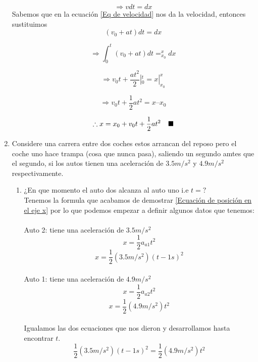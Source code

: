 \documentclass[letterpaper, 12pt]{article}
\begin{document}
\begin{enumerate}
\begin{equation} 
\Longrightarrow v dt = dx 
\end{equation}
Sabemos que en la ecuación \ref{Eq de velocidad} nos da la velocidad, entonces sustituimos 
\begin{equation} 
(v_0 + at) dt = dx 
\end{equation}

\begin{equation} 
\Longrightarrow\int_{0} ^{t} (v_0 + at) dt =  _{x_0} ^{x} dx 
\end{equation}

\begin{equation}
\Longrightarrow v_0 t + \frac{at^2}{2} |_{0}^{t} = x |_{x_0}^{x}
\end{equation}

\begin{equation}
\Longrightarrow v_0 t + \frac{1}{2} at^2 = x – x_0
\end{equation}

\begin{equation}
\therefore x = x_0 + v_0 t + \frac{1}{2} at^2\textcolor{white}{iii} \blacksquare
\end{equation}
    
    \item Considere una carrera entre dos coches estos arrancan del reposo pero el coche uno hace trampa (cosa que nunca pasa), saliendo un segundo amtes que el segundo, si los autos tienen una aceleración de $3.5 m/s^2$  y  $4.9 m/s^2$ respectivamente.
    
\begin{enumerate}
    \item {¿En que momento el auto dos alcanza al auto uno i.e $t=?$}\\
Tenemos la formula que acabamos de demostrar \ref{Ecuación de posición en el eje x} por lo que podemos empezar a definir algunos datos que tenemos:\\\\
Auto 2: tiene una aceleración de $3.5m/s^2$
\begin{equation}
\label{Ecuacion inciso a auto 1}
    x= \frac{1}{2} a_{a1} t^2 
\end{equation}
\begin{equation}
\label{Ecuación inciso a auto 2}
     x= \frac{1}{2} (3.5 m/s^2)(t-1s)^2 
\end{equation}
\\
Auto 1: tiene una aceleración de $4.9m/s^2$
\\
\begin{equation}
    x = \frac{1}{2} a_{a2}t^2
\end{equation}
\begin{equation}
    x = \frac{1}{2} (4.9 m/s^2)t^2
\end{equation}
\\
Igualamos las dos ecuaciones que nos dieron y desarrollamos hasta encontrar $t$.
\begin{equation}
\label{Eq inciso 2 ya igualada}
    \frac{1}{2} (3.5 m/s^2)(t-1s)^2 = \frac{1}{2} (4.9 m/s^2)t^2
\end{equation}


\end{enumerate}
\end{enumerate}
\end{document}
